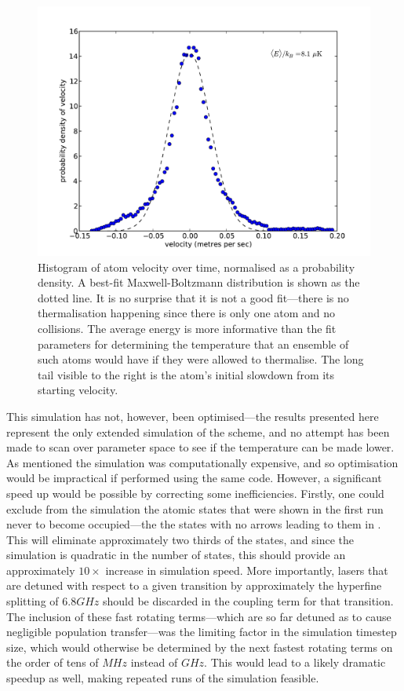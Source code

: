 \begin{figure}
\begin{center}
\includegraphics[width=\textwidth]{figures/unsorted/cold_atom.pdf}
\caption{\label{fig:cold_atom} Histogram of atom velocity over time, normalised as a probability density. A best-fit Maxwell-Boltzmann distribution is shown as the dotted line. It is no surprise that it is not a good fit---there is no thermalisation happening since there is only one atom and no collisions. The average energy is more informative than the fit parameters for determining the temperature that an ensemble of such atoms would have if they were allowed to thermalise. The long tail visible to the right is the atom's initial slowdown from its starting velocity.}
\end{center}
\end{figure}

This simulation has not, however, been optimised---the results presented here represent the only extended simulation of the scheme, and no attempt has been made to scan over parameter space to see if the temperature can be made lower. As mentioned the simulation was computationally expensive, and so optimisation would be impractical if performed using the same code. However, a significant speed up would be possible by correcting some inefficiencies. Firstly, one could exclude from the simulation the atomic states that were shown in the first run never to become occupied---the the states with no arrows leading to them in . This will eliminate approximately two thirds of the states, and since the simulation is quadratic in the number of states, this should provide an approximately $10\times$ increase in simulation speed. More importantly, lasers that are detuned with respect to a given transition by approximately the hyperfine splitting of $6.8\unit{GHz}$ should be discarded in the coupling term for that transition. The inclusion of these fast rotating terms---which are so far detuned as to cause negligible population transfer---was the limiting factor in the simulation timestep size, which would otherwise be determined by the next fastest rotating terms on the order of tens of $\unit{MHz}$ instead of $\unit{GHz}$. This would lead to a likely dramatic speedup as well, making repeated runs of the simulation feasible.

